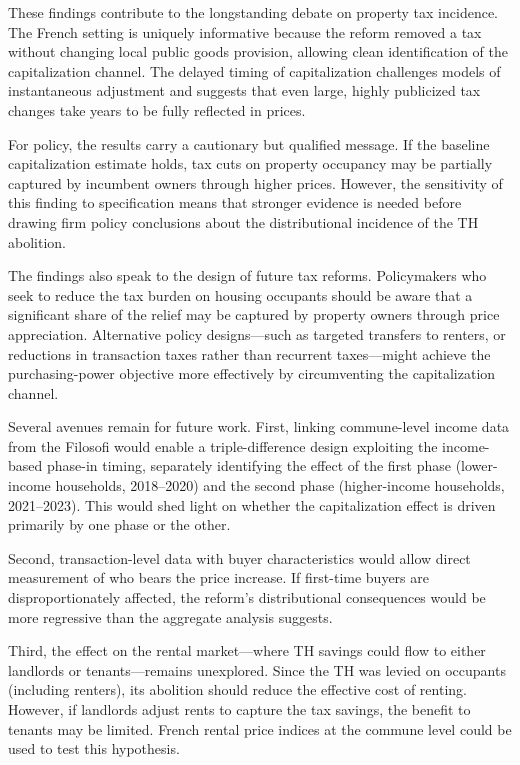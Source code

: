 \documentclass[12pt]{article}
\begin{document}
These findings contribute to the longstanding debate on property tax incidence. The French setting is uniquely informative because the reform removed a tax without changing local public goods provision, allowing clean identification of the capitalization channel. The delayed timing of capitalization challenges models of instantaneous adjustment and suggests that even large, highly publicized tax changes take years to be fully reflected in prices.

For policy, the results carry a cautionary but qualified message. If the baseline capitalization estimate holds, tax cuts on property occupancy may be partially captured by incumbent owners through higher prices. However, the sensitivity of this finding to specification means that stronger evidence is needed before drawing firm policy conclusions about the distributional incidence of the TH abolition.

The findings also speak to the design of future tax reforms. Policymakers who seek to reduce the tax burden on housing occupants should be aware that a significant share of the relief may be captured by property owners through price appreciation. Alternative policy designs---such as targeted transfers to renters, or reductions in transaction taxes rather than recurrent taxes---might achieve the purchasing-power objective more effectively by circumventing the capitalization channel.

Several avenues remain for future work. First, linking commune-level income data from the Filosofi would enable a triple-difference design exploiting the income-based phase-in timing, separately identifying the effect of the first phase (lower-income households, 2018--2020) and the second phase (higher-income households, 2021--2023). This would shed light on whether the capitalization effect is driven primarily by one phase or the other.

Second, transaction-level data with buyer characteristics would allow direct measurement of who bears the price increase. If first-time buyers are disproportionately affected, the reform's distributional consequences would be more regressive than the aggregate analysis suggests.

Third, the effect on the rental market---where TH savings could flow to either landlords or tenants---remains unexplored. Since the TH was levied on occupants (including renters), its abolition should reduce the effective cost of renting. However, if landlords adjust rents to capture the tax savings, the benefit to tenants may be limited. French rental price indices at the commune level could be used to test this hypothesis.
\end{document}
